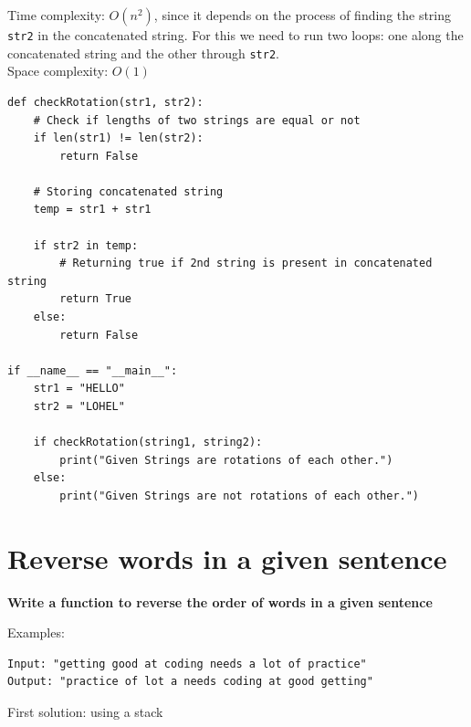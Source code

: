 \documentclass[a4paper,11pt]{book}
\begin{document}
\noindent Time complexity: $O(n^2)$, since it depends on the process of finding the string \lstinline{str2} in the concatenated string. For this we need to run two loops: one along the concatenated string and the other through \lstinline{str2}.\\

\noindent Space complexity: $O(1)$

\begin{lstlisting}
def checkRotation(str1, str2): 
    # Check if lengths of two strings are equal or not 
    if len(str1) != len(str2): 
        return False
  
    # Storing concatenated string 
    temp = str1 + str1 
  
    if str2 in temp:
        # Returning true if 2nd string is present in concatenated string
        return True 
    else: 
        return False
  
if __name__ == "__main__":
    str1 = "HELLO"
    str2 = "LOHEL"
      
    if checkRotation(string1, string2): 
        print("Given Strings are rotations of each other.")
    else: 
        print("Given Strings are not rotations of each other.")
\end{lstlisting}


\newpage
\section{Reverse words in a given sentence}
\textbf{Write a function to reverse the order of words in a given sentence}
\vspace{5mm}

\noindent Examples:
\begin{lstlisting}
Input: "getting good at coding needs a lot of practice"
Output: "practice of lot a needs coding at good getting"
\end{lstlisting}
\vspace{5mm}

\noindent First solution: using a stack
\vspace{5mm}
\end{document}

